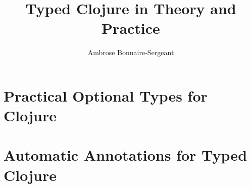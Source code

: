 \documentclass[11pt]{iuthesis}
\newcommand{\thesisauthor}[0]{Ambrose Bonnaire-Sergeant}
\newcommand{\thesistitle}[0]{Typed Clojure in Theory and Practice}
\begin{document}
\frontmatter %
\title{\thesistitle{}}
\author{\thesisauthor{}}



\begin{abstract}

\end{abstract}

\maketitle
\signaturepage
\copyrightpage
\makeabstract

\singlespacing
\tableofcontents

\listoffigures

\listoftheorems
\doublespacing

\newpage

\mainmatter



\part{Practical Optional Types for Clojure}
\label{part:types}









\part{Automatic Annotations for Typed Clojure}
\label{part:autoann}











\end{document}
